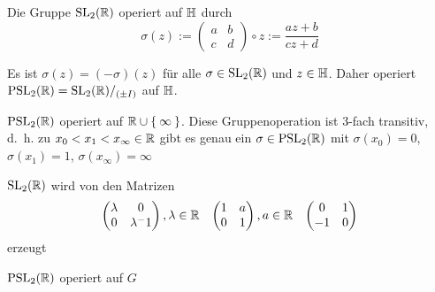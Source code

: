 \begin{proposition}%
    \begin{propenum}
        \item Die Gruppe $\mathrm{SL}_2(\mathbb{R})$ operiert auf $\mathbb{H}$ durch
              \[\sigma(z):= \begin{pmatrix}a & b\\c & d\end{pmatrix} \circ z := \frac{az + b}{cz + d}\]
        \item Es ist $\sigma(z) = (-\sigma)(z)$ für alle $\sigma \in \mathrm{SL}_2(\mathbb{R})$
              und $z \in \mathbb{H}$. Daher operiert $\mathrm{PSL}_2(\mathbb{R}) = \mathrm{SL}_2(\mathbb{R}) /_{(\pm I)}$
              auf $\mathbb{H}$.
        \item $\mathrm{PSL}_2(\mathbb{R})$ operiert auf $\mathbb{R} \cup \Set{\infty}$.
              Diese Gruppenoperation ist 3-fach transitiv, d.~h. zu
              $x_0 < x_1 < x_\infty \in \mathbb{R}$ gibt es genau ein
              $\sigma \in \mathrm{PSL}_2(\mathbb{R})$ mit $\sigma(x_0) = 0$,
              $\sigma(x_1) = 1$, $\sigma(x_\infty) = \infty$
        \item \label{prop:15.2d} $\mathrm{SL}_2(\mathbb{R})$ wird von den Matrizen
              \[\begin{pmatrix}\lambda & 0\\ 0 & \lambda^-1\end{pmatrix}, \lambda \in \mathbb{R} \;\;\; 
                \begin{pmatrix}1 & a\\ 0 & 1\end{pmatrix}, a \in \mathbb{R}\;\;\; 
                \begin{pmatrix}0 & 1\\-1 & 0\end{pmatrix}\]
              erzeugt
        \item \label{prop:15.2e} $\mathrm{PSL}_2(\mathbb{R})$ operiert auf $G$
    \end{propenum}
\end{proposition}

